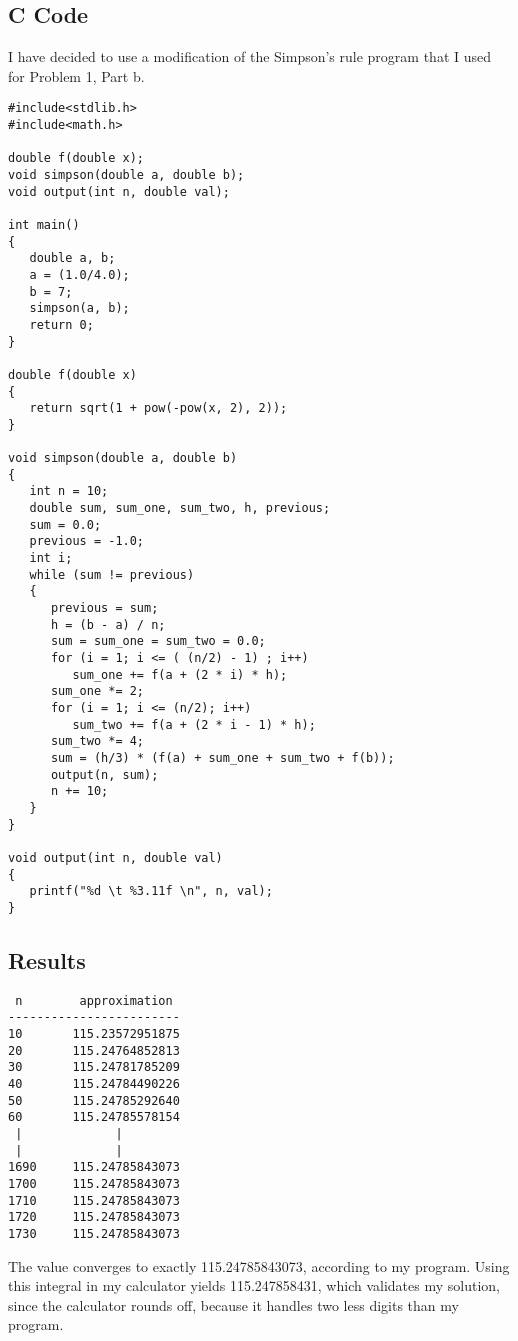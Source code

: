 \documentclass{article}
\begin{document}
\subsection*{C Code}
I have decided to use a modification of the Simpson's rule program that I used
for Problem 1, Part b.

\begin{verbatim}
#include<stdlib.h>
#include<math.h>

double f(double x);
void simpson(double a, double b);
void output(int n, double val);

int main()
{
   double a, b;
   a = (1.0/4.0);
   b = 7;
   simpson(a, b); 
   return 0;
}

double f(double x)
{
   return sqrt(1 + pow(-pow(x, 2), 2));
}

void simpson(double a, double b)
{
   int n = 10;
   double sum, sum_one, sum_two, h, previous;
   sum = 0.0;
   previous = -1.0;
   int i;
   while (sum != previous) 
   {
      previous = sum;   
      h = (b - a) / n;
      sum = sum_one = sum_two = 0.0;
      for (i = 1; i <= ( (n/2) - 1) ; i++)
         sum_one += f(a + (2 * i) * h);
      sum_one *= 2;
      for (i = 1; i <= (n/2); i++)
         sum_two += f(a + (2 * i - 1) * h);
      sum_two *= 4; 
      sum = (h/3) * (f(a) + sum_one + sum_two + f(b));
      output(n, sum);
      n += 10;
   }
}

void output(int n, double val)
{
   printf("%d \t %3.11f \n", n, val);
}
\end{verbatim}

\subsection*{Results}

\begin{verbatim}
 n        approximation
------------------------
10       115.23572951875 
20       115.24764852813 
30       115.24781785209 
40       115.24784490226 
50       115.24785292640 
60       115.24785578154
 |             |
 |             |
1690     115.24785843073 
1700     115.24785843073 
1710     115.24785843073 
1720     115.24785843073 
1730     115.24785843073 
\end{verbatim}

The value converges to exactly 115.24785843073, according to my program. 
Using this integral in my calculator yields 115.247858431, which validates my
solution, since the calculator rounds off, because it handles two less digits 
than my program. 
\end{document}
